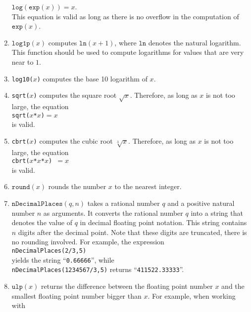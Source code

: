 \begin{enumerate}
      \hspace*{1.3cm}
      $\mathtt{log}(\mathtt{exp}(x)) = x$.
      \\[0.2cm]
      This equation is valid as long as there is no overflow in the computation of
      $\mathtt{exp}(x)$.
\item $\mathtt{log1p}(x)$ computes $\mathtt{ln}(x + 1)$, where $\mathtt{ln}$ denotes the natural
      logarithm.  This function should be used to compute logarithms for values that are very near
      to $1$.
\item \texttt{log10($x$)} computes the base 10 logarithm of $x$.
\item \texttt{sqrt($x$)} computes the square root $\sqrt{x}$.  Therefore, as long as $x$
      is not too large, the equation
      \\[0.2cm]
      \hspace*{1.3cm}
      \texttt{sqrt($x$*$x$)$=x$}
      \\[0.2cm]
      is valid.
\item \texttt{cbrt($x$)} computes the cubic root $\sqrt[3]{x}$.  Therefore, as long as $x$
      is not too large, the equation
      \\[0.2cm]
      \hspace*{1.3cm}
      \texttt{cbrt($x$*$x$*$x$) $= x$}
      \\[0.2cm]
      is valid.
\item $\texttt{round}(x)$ rounds the number $x$ to the nearest integer.
\item $\texttt{nDecimalPlaces}(q, n)$ takes a rational number $q$ and a positive natural
      number $n$ as arguments.  It converts the rational number $q$ into a string that denotes the
      value of $q$ in decimal floating point notation.  This string contains $n$ digits after the
      decimal point.  Note that these digits are truncated, there is no rounding
      involved.  For example, the expression
      \\[0.2cm]
      \hspace*{1.3cm}
      \texttt{nDecimalPlaces(2/3,5)}
      \\[0.2cm]
      yields the string ``\texttt{0.66666}'', while 
      \\[0.2cm]
      \hspace*{1.3cm}
      \texttt{nDecimalPlaces(1234567/3,5)} returns ``\texttt{411522.33333}''.
\item $\mathtt{ulp}(x)$  returns the difference between the floating point number $x$ and
      the smallest floating point number bigger than $x$.  For example, when working with

\end{enumerate}
